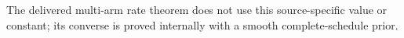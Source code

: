 The delivered multi-arm rate theorem does not use this source-specific value or constant; its converse is proved internally with a smooth complete-schedule prior.